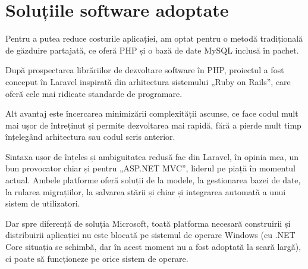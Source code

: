 \section{Soluțiile software adoptate}

	Pentru a putea reduce costurile aplicației, am optat pentru o metodă tradițională de găzduire partajată, ce oferă PHP și o bază de date MySQL inclusă în pachet.

	După prospectarea librăriilor de dezvoltare software în PHP, proiectul a fost conceput în Laravel\cite{laravel} inspirată din arhitectura sistemului „Ruby on Rails”, care oferă cele mai ridicate standarde de programare.

	Alt avantaj este încercarea minimizării complexității ascunse\cite{laravel_complexity}, ce face codul mult mai ușor de întreținut și permite dezvoltarea mai rapidă, fără a pierde mult timp înțelegând arhitectura sau codul scris anterior.

	Sintaxa ușor de înțeles și ambiguitatea redusă fac din Laravel, în opinia mea, un bun provocator chiar și pentru „ASP.NET MVC”\cite{hotframeworks}, liderul pe piață în momentul actual.
	Ambele platforme oferă soluții de la modele, la gestionarea bazei de date, la rularea migrațiilor, la salvarea stării și chiar și integrarea automată a unui sistem de utilizatori.

	Dar spre diferență de soluția Microsoft, toată platforma necesară construirii și distribuirii aplicației nu este blocată pe sistemul de operare Windows (cu .NET Core situația se schimbă, dar în acest moment nu a fost adoptată la scară largă), ci poate să funcționeze pe orice sistem de operare.
